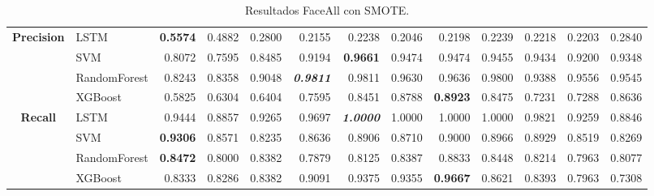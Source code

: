 \begin{table}[H]
\begin{adjustbox}{max width=12cm}
\begin{tabular}{|c|l|r|r|r|r|r|r|r|r|r|r|r|}
			\hline
			\textbf{Precision} & LSTM &  \textbf{0.5574} &  0.4882 &  0.2800 &  0.2155 &  0.2238 &  0.2046 &  0.2198 &  0.2239 &  0.2218 &  0.2203 &  0.2840 \\
			& SVM &  0.8072 &  0.7595 &  0.8485 &  0.9194 &  \textbf{0.9661} &  0.9474 &  0.9474 &  0.9455 &  0.9434 &  0.9200 &  0.9348 \\
			& RandomForest &  0.8243 &  0.8358 &  0.9048 &  \textit{\textbf{0.9811}} &  0.9811 &  0.9630 &  0.9636 &  0.9800 &  0.9388 &  0.9556 &  0.9545 \\
			& XGBoost &  0.5825 &  0.6304 &  0.6404 &  0.7595 &  0.8451 &  0.8788 &  \textbf{0.8923} &  0.8475 &  0.7231 &  0.7288 &  0.8636 \\
			\hline
			\textbf{Recall} & LSTM &  0.9444 &  0.8857 &  0.9265 &  0.9697 &  \textit{\textbf{1.0000}} &  1.0000 &  1.0000 &  1.0000 &  0.9821 &  0.9259 &  0.8846 \\
			& SVM &  \textbf{0.9306} &  0.8571 &  0.8235 &  0.8636 &  0.8906 &  0.8710 &  0.9000 &  0.8966 &  0.8929 &  0.8519 &  0.8269 \\
			& RandomForest &  \textbf{0.8472} &  0.8000 &  0.8382 &  0.7879 &  0.8125 &  0.8387 &  0.8833 &  0.8448 &  0.8214 &  0.7963 &  0.8077 \\
			& XGBoost &  0.8333 &  0.8286 &  0.8382 &  0.9091 &  0.9375 &  0.9355 &  \textbf{0.9667} &  0.8621 &  0.8393 &  0.7963 &  0.7308 \\
			\hline
		\end{tabular}
	\end{adjustbox}
	\caption{Resultados FaceAll con SMOTE.}
	\label{tab:faceAllSMOTE}
\end{table}

